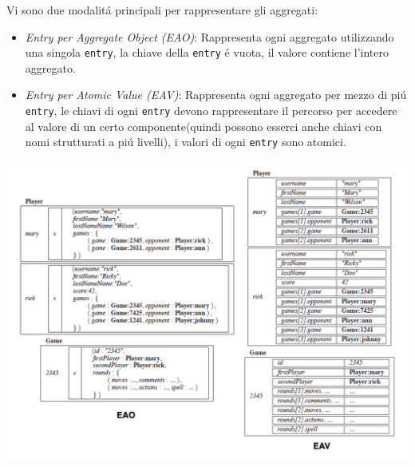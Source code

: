 Vi sono due modalitá principali per rappresentare gli aggregati:\begin{itemize}
    \item \emph{Entry per Aggregate Object (EAO)}: Rappresenta ogni aggregato utilizzando una singola
    \texttt{entry}, la chiave della \texttt{entry} é vuota, il valore contiene l'intero aggregato.
    \item \emph{Entry per Atomic Value (EAV)}: Rappresenta ogni aggregato per mezzo di piú \texttt{entry}, le chiavi
    di ogni \texttt{entry} devono rappresentare il percorso per accedere al valore di un certo componente(quindi possono esserci anche chiavi
    con nomi strutturati a piú livelli), i valori di ogni \texttt{entry} sono atomici.
\end{itemize}
    \includegraphics[width=1\textwidth]{img/eao.eav}

